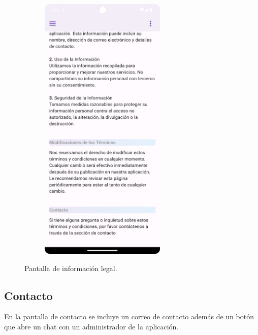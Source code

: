 \documentclass[a4paper, 12pt]{article}
\begin{document}
\begin{figure}[H]
\begin{subfigure}{0.48\textwidth}
\begin{center}
			{\includegraphics[width=6cm]{app/LegalPage2.png}\par}
		\end{center}  
	\end{subfigure}\hfill
	\caption{Pantalla de información legal.}
\end{figure}


\newpage
\subsection*{Contacto}

En la pantalla de contacto se incluye un correo de contacto además de un botón que abre un chat con un administrador de la aplicación.
\end{document}
